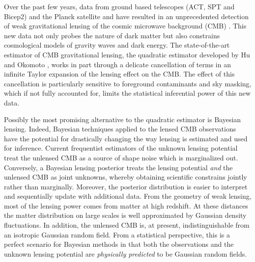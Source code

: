 \documentclass[noinfoline]{imsart}
\begin{document}
 Over the past few years, data from ground based telescopes (ACT, SPT and Bicep2) and the Planck satellite and have resulted in an unprecedented detection of weak gravitational lensing of the cosmic microwave background (CMB) \cite{das2011detection,van2012measurement,ade2013planck}.  This new data not only probes the nature of dark matter but also constrains cosmological models of gravity waves and dark energy. The state-of-the-art estimator of CMB gravitational lensing, the quadratic estimator developed by Hu and Okomoto \cite{hu2001mapping,hu2002mass}, works in part through a delicate cancellation of terms in an infinite Taylor expansion of the lensing effect on the CMB. The effect of this cancellation is particularly sensitive to foreground contaminants and sky masking, which  if not fully accounted for,  limits  the statistical inferential power of this new data.  

 Possibly the most promising alternative to the quadratic estimator is Bayesian lensing. Indeed, Bayesian techniques applied to the lensed CMB observations have the potential for drastically changing the way lensing is estimated and used for inference.  Current frequentist estimators of the unknown lensing potential treat the unlensed CMB as a source of shape noise which is marginalized out. Conversely, a Bayesian lensing posterior treats the lensing potential {\em and} the unlensed CMB as joint unknowns, whereby obtaining scientific constrains jointly rather than marginally. Moreover, the  posterior distribution is easier to interpret and sequentially update with additional data. From the geometry of weak lensing, most of the lensing power comes from matter at high redshift. At these distances the matter distribution on large scales is well approximated by Gaussian density fluctuations. In addition, the unlensed CMB is, at present, indistinguishable from an isotropic Gaussian random field.  From a statistical perspective, this is a perfect scenario for Bayesian methods in that both the observations and the unknown lensing potential are {\em physically predicted} to be Gaussian random fields.  
 
\end{document}
